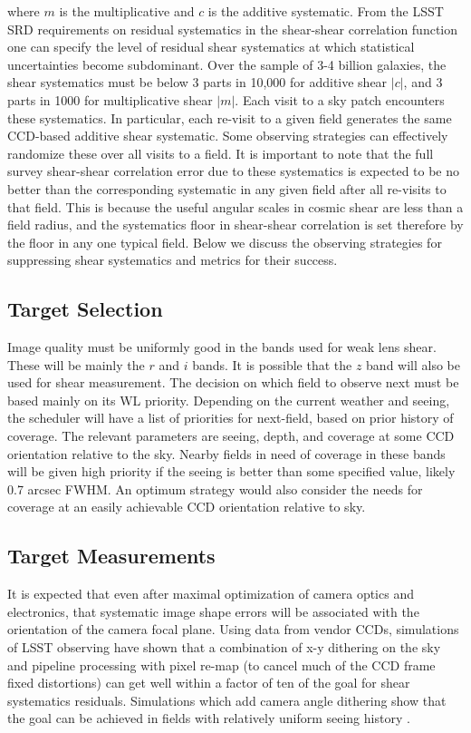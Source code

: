 where $m$ is the multiplicative and $c$ is the additive systematic.  From the
LSST SRD requirements on residual systematics in the shear-shear correlation
function one can specify the level of residual shear systematics at which
statistical uncertainties become subdominant.  Over the sample of 3-4 billion
galaxies, the shear systematics must be below 3 parts in 10,000 for additive
shear $|c|$, and 3 parts in 1000 for multiplicative shear $|m|$.  Each visit to
a sky patch encounters these systematics.  In particular, each re-visit to a
given field generates the same CCD-based additive shear systematic.  Some
observing strategies can effectively randomize these over all visits to a field.
It is important to note that the full survey shear-shear correlation error due
to these systematics is expected to be no better than the corresponding
systematic in any given field after all re-visits to that field. This is because
the useful angular scales in cosmic shear are less than a field radius, and the
systematics floor in shear-shear correlation is set therefore by the floor in
any one typical field.  Below we discuss the observing strategies for
suppressing shear systematics and metrics for their success.


\subsection{Target Selection}

Image quality must be uniformly good in the bands used for weak lens shear.
These will be mainly the $r$ and $i$ bands. It is possible that the $z$ band
will also be used for shear measurement.  The decision on which field to observe
next must be based mainly on its WL priority.  Depending on the current weather
and seeing, the scheduler will have a list of priorities for next-field, based
on prior history of coverage.  The relevant parameters are seeing, depth, and
coverage at some CCD orientation relative to the sky.  Nearby fields in need of
coverage in these bands will be given high priority if the seeing is better than
some specified value, likely 0.7 arcsec FWHM. An optimum strategy would also
consider the needs for coverage at an easily achievable CCD orientation relative
to sky.


\subsection{Target Measurements}

It is expected that even after maximal optimization of camera optics and
electronics, that systematic image shape errors will be associated with the
orientation of the camera focal plane.  Using data from vendor CCDs, simulations
of LSST observing have shown that a combination of x-y dithering on the sky and
pipeline processing with pixel re-map (to cancel much of the CCD frame fixed
distortions) can get well within a factor of ten of the goal for shear
systematics residuals.  Simulations which add camera angle dithering show that
the goal can be achieved in fields with relatively uniform seeing history
\citep{Jee&Tyson2011}.

